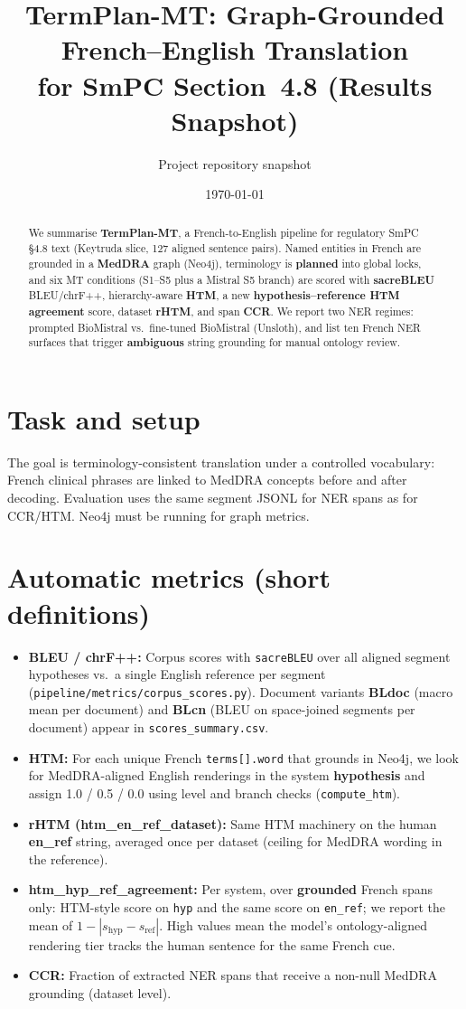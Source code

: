 \documentclass[11pt]{article}
\title{TermPlan-MT: Graph-Grounded French--English Translation\\for SmPC Section~4.8 (Results Snapshot)}
\author{Project repository snapshot}
\date{\today}
\begin{document}
\maketitle

\begin{abstract}
We summarise \textbf{TermPlan-MT}, a French-to-English pipeline for regulatory SmPC \S4.8 text (Keytruda slice, 127 aligned sentence pairs). Named entities in French are grounded in a \textbf{MedDRA} graph (Neo4j), terminology is \textbf{planned} into global locks, and six MT conditions (S1--S5 plus a Mistral S5 branch) are scored with \textbf{sacreBLEU} BLEU/chrF++, hierarchy-aware \textbf{HTM}, a new \textbf{hypothesis--reference HTM agreement} score, dataset \textbf{rHTM}, and span \textbf{CCR}. We report two NER regimes: prompted BioMistral vs.\ fine-tuned BioMistral (Unsloth), and list ten French NER surfaces that trigger \textbf{ambiguous} string grounding for manual ontology review.
\end{abstract}

\section{Task and setup}
The goal is terminology-consistent translation under a controlled vocabulary: French clinical phrases are linked to MedDRA concepts before and after decoding. Evaluation uses the same segment JSONL for NER spans as for CCR/HTM. Neo4j must be running for graph metrics.

\section{Automatic metrics (short definitions)}
\begin{itemize}
  \item \textbf{BLEU / chrF++:} Corpus scores with \texttt{sacreBLEU} over all aligned segment hypotheses vs.\ a single English reference per segment (\texttt{pipeline/metrics/corpus\_scores.py}). Document variants \textbf{BLdoc} (macro mean per document) and \textbf{BLcn} (BLEU on space-joined segments per document) appear in \texttt{scores\_summary.csv}.
  \item \textbf{HTM:} For each unique French \texttt{terms[].word} that grounds in Neo4j, we look for MedDRA-aligned English renderings in the system \textbf{hypothesis} and assign 1.0 / 0.5 / 0.0 using level and branch checks (\texttt{compute\_htm}).
  \item \textbf{rHTM (htm\_en\_ref\_dataset):} Same HTM machinery on the human \textbf{en\_ref} string, averaged once per dataset (ceiling for MedDRA wording in the reference).
  \item \textbf{htm\_hyp\_ref\_agreement:} Per system, over \textbf{grounded} French spans only: HTM-style score on \texttt{hyp} and the same score on \texttt{en\_ref}; we report the mean of $1 - |s_{\mathrm{hyp}} - s_{\mathrm{ref}}|$. High values mean the model's ontology-aligned rendering tier tracks the human sentence for the same French cue.
  \item \textbf{CCR:} Fraction of extracted NER spans that receive a non-null MedDRA grounding (dataset level).
\end{itemize}
\end{document}
